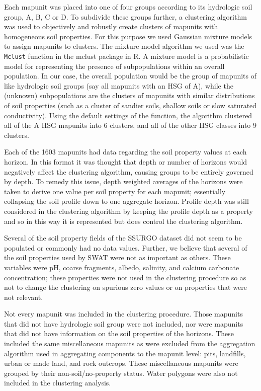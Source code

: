Each mapunit was placed into one of four groups according to its hydrologic soil group, A, B, C or D. To subdivide these groups further, a clustering algorithm was used to objectively and robustly create clusters of mapunits with homogeneous soil properties. For this purpose we used Gaussian mixture models to assign mapunits to clusters. The mixture model algorithm we used was the \texttt{Mclust} function in the mclust package \citep{mclust_2012} in R. A mixture model is a probabilistic model for representing the presence of subpopulations within an overall population. In our case, the overall population would be the group of mapunits of like hydrologic soil groups (say all mapunits with an HSG of A), while the (unknown) subpopulations are the clusters of mapunits with similar distributions of soil properties (such as a cluster of sandier soils, shallow soils or slow saturated conductivity). Using the default settings of the function, the algorithm clustered all of the A HSG mapunits into 6 clusters, and all of the other HSG classes into 9 clusters.   

Each of the 1603 mapunits had data regarding the soil property values at each horizon. In this format it was thought that depth or number of horizons would negatively affect the clustering algorithm, causing groups to be entirely governed by depth. To remedy this issue, depth weighted averages of the horizons were taken to derive one value per soil property for each mapunit; essentially collapsing the soil profile down to one aggregate horizon. Profile depth was still considered in the clustering algorithm by keeping the profile depth as a property and so in this way it is represented but does control the clustering algorithm.

Several of the soil property fields of the SSURGO dataset did not seem to be populated or commonly had no data values. Further, we believe that several of the soil properties used by SWAT were not as important as others. These variables were pH, coarse fragments, albedo, salinity, and calcium carbonate concentration; these properties were not used in the clustering procedure so as not to change the clustering on spurious zero values or on properties that were not relevant. 

Not every mapunit was included in the clustering procedure. Those mapunits that did not have hydrologic soil group were not included, nor were mapunits that did not have information on the soil properties of the horizons. These included the same miscellaneous mapunits as were excluded from the aggregation algorithm used in aggregating components to the mapunit level: pits, landfills, urban or made land, and rock outcrops. These miscellaneous mapunits were grouped by their non-soil/no-property status. Water polygons were also not included in the clustering analysis.

